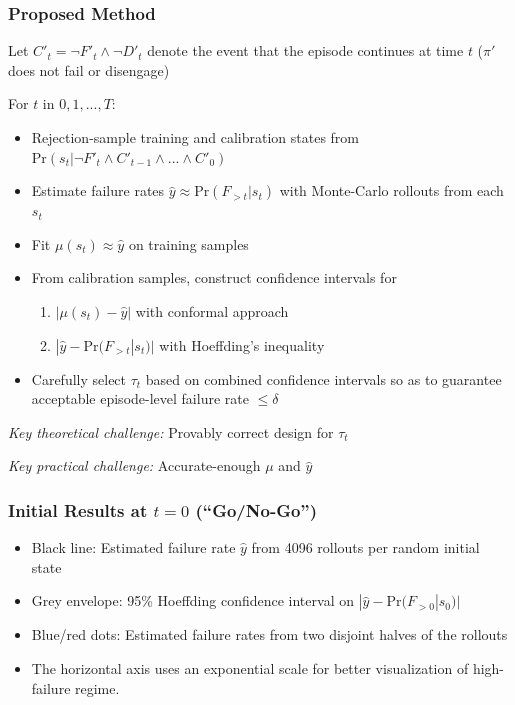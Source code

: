 \documentclass[handout]{beamer}
\begin{document}
\begin{frame}
    \frametitle{Proposed Method}
    Let $C'_t = \neg F'_t \wedge \neg D'_t$ denote the event that the episode continues at time $t$ ($\pi'$ does not fail or disengage)

    \vspace{1em}

    For $t$ in $0,1,...,T$:
    \begin{itemize}
    \item Rejection-sample training and calibration states from $\text{Pr}(s_t|\neg F'_t \wedge C'_{t-1}\wedge...\wedge C'_0)$
    \item Estimate failure rates $\hat{y}\approx \text{Pr}(F_{>t}|s_t)$ with Monte-Carlo rollouts from each $s_t$
    \item Fit $\mu(s_t) \approx \hat{y}$ on training samples
    \item From calibration samples, construct confidence intervals for
        \begin{enumerate}
        \item $|\mu(s_t) - \hat{y}|$ with conformal approach
        \item $|\hat{y} - \text{Pr}(F_{>t}|s_t)|$ with Hoeffding's inequality 
        \end{enumerate}
    \item Carefully select $\tau_t$ based on combined confidence intervals so as to guarantee acceptable episode-level failure rate $\leq\delta$
    \end{itemize}

    \textit{Key theoretical challenge:} Provably correct design for $\tau_t$

    \textit{Key practical challenge:} Accurate-enough $\mu$ and $\hat{y}$

\end{frame}

\begin{frame}
    \frametitle{Initial Results at $t=0$ (``Go/No-Go'')}

    \begin{itemize}
    \item Black line: Estimated failure rate $\hat{y}$ from 4096 rollouts per random initial state
    \item Grey envelope: 95\% Hoeffding confidence interval on $|\hat{y} - \text{Pr}(F_{> 0}|s_0)|$
    \item Blue/red dots: Estimated failure rates from two disjoint halves of the rollouts
    \item The horizontal axis uses an exponential scale for better visualization of high-failure regime.
    \end{itemize}

\end{frame}
\end{document}
